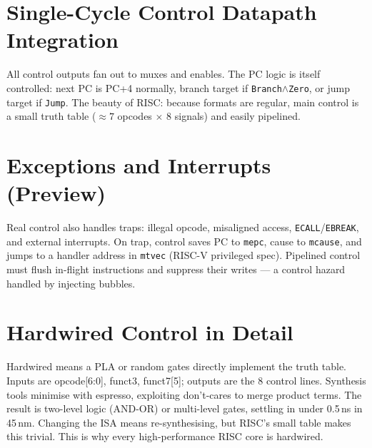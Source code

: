 \section{Single-Cycle Control Datapath Integration}
All control outputs fan out to muxes and enables. The PC logic is itself controlled: next PC is PC+4 normally, branch target if \texttt{Branch}$\land$\texttt{Zero}, or jump target if \texttt{Jump}. The beauty of RISC: because formats are regular, main control is a small truth table ($\approx 7$ opcodes $\times$ 8 signals) and easily pipelined.

\begin{center}
\end{center}

\section{Exceptions and Interrupts (Preview)}
Real control also handles traps: illegal opcode, misaligned access, \texttt{ECALL}/\texttt{EBREAK}, and external interrupts.
On trap, control saves PC to \texttt{mepc}, cause to \texttt{mcause}, and jumps to a handler address in \texttt{mtvec} (RISC-V privileged spec). Pipelined control must flush in-flight instructions and suppress their writes --- a control hazard handled by injecting bubbles.

\section{Hardwired Control in Detail}
Hardwired means a PLA or random gates directly implement the truth table. Inputs are opcode[6:0], funct3, funct7[5]; outputs are the 8 control lines. Synthesis tools minimise with espresso, exploiting don't-cares to merge product terms. The result is two-level logic (AND-OR) or multi-level gates, settling in under 0.5\,ns in 45\,nm. Changing the ISA means re-synthesising, but RISC's small table makes this trivial. This is why every high-performance RISC core is hardwired.

